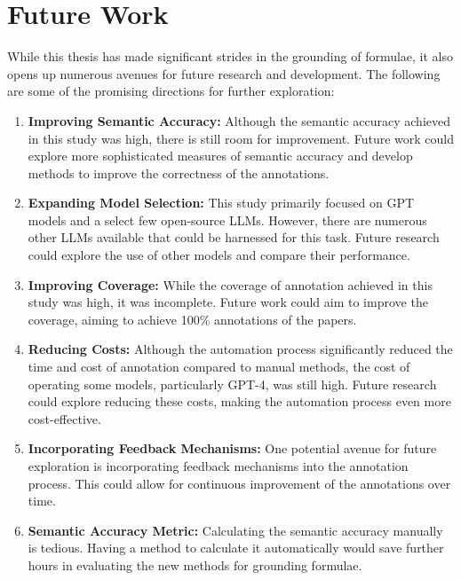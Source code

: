 \chapter{Future Work}\label{chapter:future_works}

While this thesis has made significant strides in the grounding of formulae, it also opens up numerous avenues for future research and development. The following are some of the promising directions for further exploration:

\begin{enumerate}

\item \textbf{Improving Semantic Accuracy:} Although the semantic accuracy achieved in this study was high, there is still room for improvement. Future work could explore more sophisticated measures of semantic accuracy and develop methods to improve the correctness of the annotations. 

\item \textbf{Expanding Model Selection:} This study primarily focused on GPT models and a select few open-source LLMs. However, there are numerous other LLMs available that could be harnessed for this task. Future research could explore the use of other models and compare their performance.

\item \textbf{Improving Coverage:} While the coverage of annotation achieved in this study was high, it was incomplete. Future work could aim to improve the coverage, aiming to achieve 100\% annotations of the papers.

\item \textbf{Reducing Costs:} Although the automation process significantly reduced the time and cost of annotation compared to manual methods, the cost of operating some models, particularly GPT-4, was still high. Future research could explore reducing these costs, making the automation process even more cost-effective.

\item \textbf{Incorporating Feedback Mechanisms:} One potential avenue for future exploration is incorporating feedback mechanisms into the annotation process. This could allow for continuous improvement of the annotations over time.

\item \textbf{Semantic Accuracy Metric:} Calculating the semantic accuracy manually is tedious. Having a method to calculate it automatically would save further hours in evaluating the new methods for grounding formulae.

\end{enumerate}

